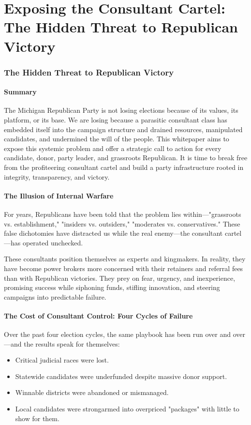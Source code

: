 \part{Exposing the Consultant Cartel: The Hidden Threat to Republican Victory}


\section{The Hidden Threat to Republican Victory}

\subsection{ Summary}
The Michigan Republican Party is not losing elections because of its values, its platform, or its base. We are losing because a parasitic consultant class has embedded itself into the campaign structure and drained resources, manipulated candidates, and undermined the will of the people. This whitepaper aims to expose this systemic problem and offer a strategic call to action for every candidate, donor, party leader, and grassroots Republican. It is time to break free from the profiteering consultant cartel and build a party infrastructure rooted in integrity, transparency, and victory.

\subsection{The Illusion of Internal Warfare}
For years, Republicans have been told that the problem lies within---"grassroots vs. establishment," "insiders vs. outsiders," "moderates vs. conservatives." These false dichotomies have distracted us while the real enemy---the consultant cartel---has operated unchecked.

These consultants position themselves as experts and kingmakers. In reality, they have become power brokers more concerned with their retainers and referral fees than with Republican victories. They prey on fear, urgency, and inexperience, promising success while siphoning funds, stifling innovation, and steering campaigns into predictable failure.

\subsection{The Cost of Consultant Control: Four Cycles of Failure}
Over the past four election cycles, the same playbook has been run over and over---and the results speak for themselves:
\begin{itemize}
\item Critical judicial races were lost.
\item Statewide candidates were underfunded despite massive donor support.
\item Winnable districts were abandoned or mismanaged.
\item Local candidates were strongarmed into overpriced "packages" with little to show for them.
\end{itemize}

